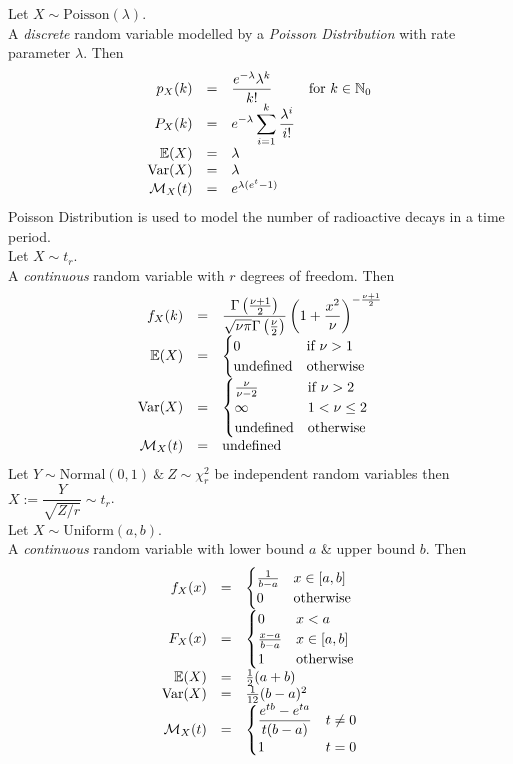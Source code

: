 \documentclass[11pt,a4paper]{article}
\begin{document}
Let $X\sim\text{Poisson}(\lambda)$.\\
A \textit{discrete} random variable modelled by a \textit{Poisson Distribution} with rate parameter $\lambda$. Then
\[\begin{array}{rcll}
p_X(k)&=&\dfrac{e^{-\lambda}\lambda^k}{k!}&\text{for }k\in\mathbb{N}_0\\
P_X(k)&=&{\displaystyle e^{-\lambda}\sum_{i=1}^k\frac{\lambda^i}{i!}}\\
\mathbb{E}(X)&=&\lambda\\
\mathrm{Var}(X)&=&\lambda\\
\mathcal{M}_X(t)&=&e^{\lambda(e^t-1)}
\end{array}\]
\nb Poisson Distribution is used to model the number of radioactive decays in a time period.\\

Let $X\sim t_r$.\\
A \textit{continuous} random variable with $r$ degrees of freedom. Then
\[\begin{array}{rcll}
f_X(k)&=&{\displaystyle\frac{\Gamma\left(\frac{\nu+1}{2}\right)}{\sqrt{\nu\pi}\Gamma\left(\frac{\nu}{2}\right)}\left(1+\frac{x^2}{\nu}\right)^{-\frac{\nu+1}{2}}}\\
\mathbb{E}(X)&=&\begin{cases}0&\text{if }\nu>1\\\text{undefined}&\text{otherwise}\end{cases}\\
\mathrm{Var}(X)&=&\begin{cases}\frac{\nu}{\nu-2}&\text{if }\nu>2\\\infty&1<\nu\leq2\\\text{undefined}&\text{otherwise}\end{cases}\\
\mathcal{M}_X(t)&=&\text{undefined}
\end{array}\]
\nb Let $Y\sim\text{Normal}(0,1)\ \&\ Z\sim\chi^2_r$ be independent random variables then $X:=\dfrac{Y}{\sqrt{Z/r}}\sim t_r$.\\

Let $X\sim\text{Uniform}(a,b)$.\\
A \textit{continuous} random variable with lower bound $a$ \& upper bound $b$. Then
\[\begin{array}{rcll}
f_X(x)&=&\begin{cases}\frac{1}{b-a}&x\in[a,b]\\0&\text{otherwise}\end{cases}\\
F_X(x)&=&\begin{cases}0&x<a\\\frac{x-a}{b-a}&x\in[a,b]\\1&\text{otherwise}\end{cases}\\
\mathbb{E}(X)&=&\frac{1}{2}(a+b)\\
\mathrm{Var}(X)&=&\frac{1}{12}(b-a)^2\\
\mathcal{M}_X(t)&=&\begin{cases}\dfrac{e^{tb}-e^{ta}}{t(b-a)}&t\neq0\\1&t=0\end{cases}
\end{array}\]
\end{document}

